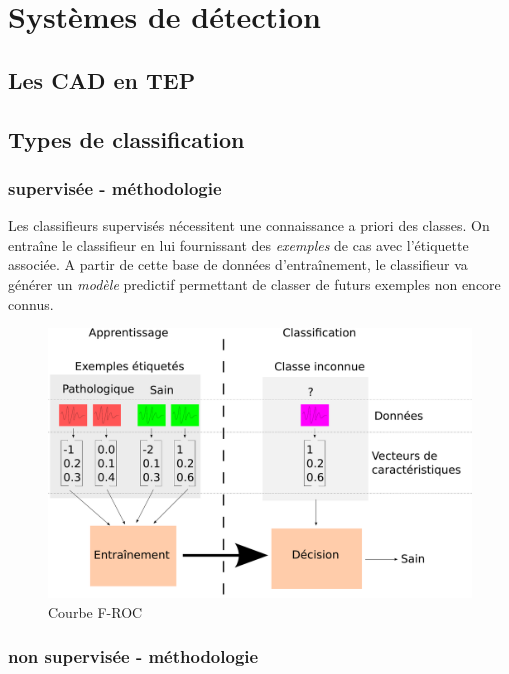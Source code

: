 \chapter{Systèmes de détection}

	\section{Les CAD en TEP}


	\section{Types de classification}
		\subsection{supervisée - méthodologie}

Les classifieurs supervisés nécessitent une connaissance a priori des classes. On entraîne le classifieur en lui fournissant des \emph{exemples} de cas avec l'étiquette associée. A partir de cette base de données d'entraînement, le classifieur va générer un \emph{modèle} predictif permettant de classer de futurs exemples non encore connus.

\begin{figure}[h]
	
	\label{fig:courbeFROC}
	\begin{center}
	\includegraphics[width=15cm]{images/fonctionnementClassif}
	\end{center}
	\caption{Courbe F-ROC}
\end{figure}

		\subsection{non supervisée - méthodologie}

